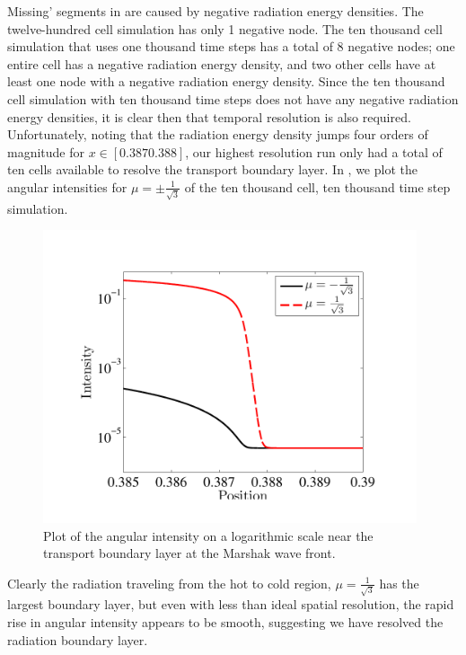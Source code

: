 Missing' segments in  are caused by negative radiation energy densities.
The twelve-hundred cell simulation has only 1 negative node.
The ten thousand cell simulation that uses one thousand time steps has a total of 8 negative nodes; one entire cell has a negative radiation energy density, and two other cells have at least one node with a negative radiation energy density.
Since the ten thousand cell simulation with ten thousand time steps does not have any negative radiation energy densities, it is clear then that temporal resolution is also required.
Unfortunately, noting that the radiation energy density jumps four orders of magnitude for $x\in[0.387 0.388]$, our highest resolution run only had a total of ten cells available to resolve the transport boundary layer.
In , we plot the angular intensities for $\mu=\pm\frac{1}{\sqrt{3}}$ of the ten thousand cell, ten thousand time step simulation.  
\begin{figure}[!htp]
\centering
\includegraphics[width=11cm,trim=0.5in  0.0in 0.5in 0.5in,clip=true]{chapter6_grey_radtran/Dissertation_Data/50_Cells_at_Wavefront_Intensity_Log.pdf}
\caption{Plot of the angular intensity on a logarithmic scale near the transport boundary layer at the Marshak wave front.}
\label{fig:boundary_layer}
\end{figure}
Clearly the radiation traveling from the hot to cold region, $\mu=\frac{1}{\sqrt{3}}$ has the largest boundary layer, but even with less than ideal spatial resolution, the rapid rise in angular intensity appears to be smooth, suggesting we have resolved the radiation boundary layer.

